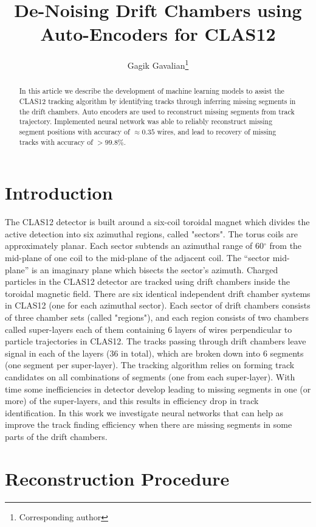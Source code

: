 \documentclass[12pt]{article}
\title{De-Noising Drift Chambers using Auto-Encoders for CLAS12}
\author[1]{Gagik Gavalian\thanks{Corresponding author}}
\affil[1]{Thomas Jefferson National Accelerator Facility, Newport News, VA 23606}
\date{}
\begin{document}
\begin{titlepage}
\maketitle
\begin{abstract}
In this article we describe the development of machine learning models to assist the CLAS12 tracking algorithm
by identifying tracks through inferring missing segments in the drift chambers.  Auto encoders are used to reconstruct 
missing segments from track trajectory. Implemented neural network was able to reliably reconstruct missing segment positions with accuracy of $\approx 0.35$ wires, and lead to recovery of missing tracks with accuracy of $>99.8\%$. 
\end{abstract}
\end{titlepage}

\section{Introduction}

\indent

The CLAS12\cite{Burkert:2020akg} detector is built around a six-coil toroidal magnet which divides the active detection into six azimuthal regions, called "sectors". The torus coils are approximately planar. Each sector subtends an azimuthal range of 60$^\circ$ from the mid-plane of one coil to the mid-plane of the adjacent coil. The “sector mid-plane” is an imaginary plane which bisects the sector’s azimuth. 
Charged particles in the CLAS12 detector are tracked using drift chambers\cite{Mestayer:2020saf} inside the toroidal magnetic field. There are six identical independent drift chamber systems in CLAS12 (one for each azimuthal sector). Each sector of drift chambers consists of three chamber sets (called "regions"), and each region consists of two chambers called super-layers each of them containing 6 layers of wires perpendicular to particle trajectories in CLAS12. The tracks passing through drift chambers leave signal in each of the layers (36 in total), which are broken down into 6 segments (one segment per super-layer). The tracking algorithm relies on forming track candidates on all combinations of segments (one from each super-layer).
With time some inefficiencies in detector develop leading to missing segments in one (or more) of the super-layers, and this results in efficiency drop in track identification. In this work we investigate neural networks that can help as improve the track finding efficiency when there are missing segments in some parts of the drift chambers.

\section{Reconstruction Procedure}

\indent

\newpage


\end{document}
